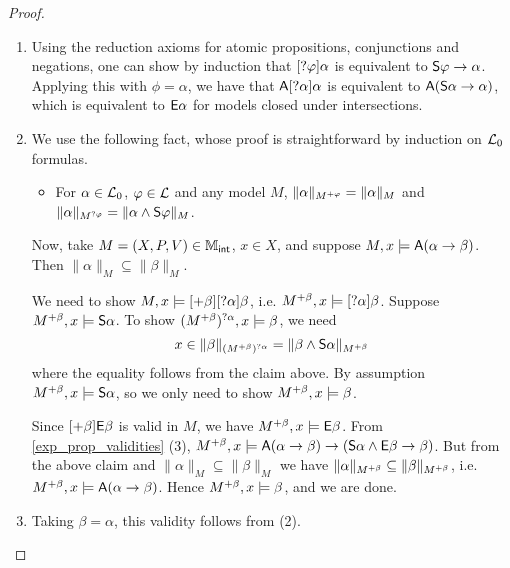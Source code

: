 \begin{proof}\leavevmode
\begin{enumerate}
\item Using the reduction axioms for atomic propositions, conjunctions and
negations, one can show by induction that $[?\varphi]\alpha$
is equivalent to $\mathsf{S}\varphi \to \alpha$. Applying this with
$\phi = \alpha$, we have that $\mathsf{A}[?\alpha]\alpha$ is
equivalent to $\mathsf{A}(\mathsf{S}\alpha \to \alpha)$, which is
equivalent to $\mathsf{E}\alpha$ for models closed under intersections.

    \item We use the following fact, whose proof is straightforward by
induction on $\mathcal{L}_0$ formulas.

    \begin{itemize}
    \item For $\alpha \in \mathcal{L}_0$, $\varphi \in \mathcal{L}$ and any model
$M$, $\|\alpha\|_{M^{+\varphi}} = \|\alpha\|_M$ and
$\|\alpha\|_{M^{?\varphi}} = \|\alpha \land \mathsf{S}\varphi\|_M$.

        \end{itemize}
    Now, take $M = (X, P, V) \in \mathbb{M}_{\mathsf{int}}$, $x \in X$, and
suppose $M, x \models \mathsf{A}(\alpha \to \beta)$. Then
$\|\alpha\|_M \subseteq \|\beta\|_M$.

    We need to show $M, x \models
[+\beta][?\alpha]\beta$, i.e. $M^{+\beta}, x
\models [?\alpha]\beta$. Suppose $M^{+\beta}, x
\models \mathsf{S}\alpha$. To show $(M^{+\beta})^{?\alpha},
x \models \beta$, we need
    \[
    x \in \|\beta\|_{(M^{+\beta})^{?\alpha}}
= \|\beta \land \mathsf{S}\alpha\|_{M^{+\beta}}\]
    where the equality follows from the claim above. By assumption
$M^{+\beta}, x \models \mathsf{S}\alpha$, so we only need to show
$M^{+\beta}, x \models \beta$.

    Since $[+\beta]\mathsf{E}\beta$ is valid in $M$, we have
$M^{+\beta}, x \models \mathsf{E}\beta$. From
\cref{exp_prop_validities} (3), $M^{+\beta}, x \models
\mathsf{A}(\alpha \to \beta) \to (\mathsf{S}\alpha \land \mathsf{E}\beta \to
\beta)$. But from the above claim and $\|\alpha\|_M \subseteq
\|\beta\|_M$ we have $\|\alpha\|_{M^{+\beta}} \subseteq
\|\beta\|_{M^{+\beta}}$, i.e. $M^{+\beta}, x \models
\mathsf{A}(\alpha \to \beta)$. Hence $M^{+\beta}, x \models
\beta$, and we are done.

    \item Taking $\beta = \alpha$, this validity follows from (2).

    \end{enumerate}
\end{proof}

